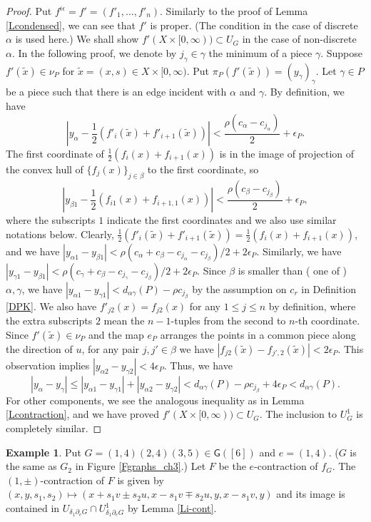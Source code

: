 \documentclass[reqno]{amsart}
\theoremstyle{definition}
\newtheorem{exa}[defi]{Example}
\theoremstyle{plain}
\newcommand{\eps}{\epsilon}
\newcommand{\GG}{\mathsf{G}}%
\begin{document}
\begin{proof}
Put  $f^{i\eps}=f'=(f'_1,\dots, f'_n)$. Similarly to the proof of Lemma \ref{Lcondensed}, we can see that $f'$ is proper. (The condition in the case of discrete $\alpha$ is used here.)  We shall show $f'(X\times [0,\infty))\subset U_{G}$ in the case of non-discrete $\alpha$. In the following proof, we denote by $j_\gamma\in \gamma$ the minimum of a piece $\gamma$.  Suppose $f'(\tilde x)\in\nu_{P}$ for $\tilde x=(x,s)\in X\times [0,\infty)$. Put $\pi_P(f'(\tilde x))=(y_\gamma)_\gamma$. Let   $\gamma\in P$ be a piece such that there is an edge incident with $\alpha$ and $\gamma$.  By definition, we have
\[
|y_\alpha-\frac{1}{2}(f'_i(\tilde x)+f'_{i+1}(\tilde x))|<\frac{\rho (c_\alpha-c_{j_\alpha})}{2}+\eps_P.
\]
 The first coordinate of $\frac{1}{2} (f_i(x)+f_{i+1}(x))$ is in the image of projection of the convex hull of $\{f_j(x)\}_{j\in \beta}$ to the first coordinate,  so 
\[
|y_{\beta 1}-\frac{1}{2}(f_{i1}(x)+f_{i+1,1}(x))|<\frac{\rho (c_\beta-c_{j_\beta})}{2}+\eps_P,
\]
where the subscripts $1$ indicate the first coordinates and we also use similar notations below. Clearly, $\frac{1}{2} (f'_i(\tilde x)+f'_{i+1}(\tilde x))=\frac{1}{2} (f_i(x)+f_{i+1}(x))$, and
 we have $|y_{\alpha 1}-y_{\beta 1}|<\rho (c_\alpha+c_\beta-c_{j_\alpha}-c_{j_\beta})/2+2\eps_P$. Similarly, we have $|y_{\gamma 1}-y_{\beta 1}|<\rho (c_\gamma+c_\beta-c_{j_\gamma}-c_{j_\beta})/2+2\eps_P$. Since $\beta$ is smaller than ( one of ) $\alpha, \gamma$,
we have
$|y_{\alpha 1}-y_{\gamma 1}|<d_{\alpha\gamma}(P)-\rho c_{j_\beta}$ by the assumption on $c_r$ in Definition \ref{DPK}.  We also have $f'_{j2}(x)=f_{j 2}(x)$ for any $1\leq j\leq n$ by definition, where the extra subscripts $2$ mean the $n-1$-tuples from  the second to $n$-th coordinate. Since $f'(\tilde x)\in \nu_{P}$ and the map $e_P$ arranges the points in a common piece along the direction of $u$, for any pair $j,j'\in \beta$ we have $|f_{j2}(\tilde x)-f_{j',2}(\tilde x)|<2\eps_{P}$. This observation implies  $|y_{\alpha 2}-y_{\gamma 2}|<4\eps_{P}$. Thus, we have 
\[
|y_\alpha-y_\gamma|\leq |y_{\alpha1}-y_{\gamma1}|+|y_{\alpha2}-y_{\gamma2}|<d_{\alpha\gamma}(P)-\rho c_{j_\beta}+4\eps_{P}<d_{\alpha\gamma}(P).
\]
For other components, we see the analogous inequality as in Lemma \ref{Lcontraction}, and we have proved $f'(X\times [0,\infty))\subset U_{G}$. The inclusion to $U^1_G$ is completely similar. 
\end{proof}
\begin{exa}\label{Ei-cont}
Put $G=(1,4)(2,4)(3,5)\in \GG([6])$ and $e=(1,4)$. ($G$ is the same as $G_2$ in Figure \ref{Fgraphs_ch3}.) Let $F$ be the $e$-contraction of $f_G$. The $(1,\pm)$-contraction of $F$ is given by $(x,y,s_1,s_2)\mapsto (x+s_1v\pm s_2u, x-s_1v\mp s_2u, y, x-s_1v, y)$ and its image is contained in $U_{\delta_1\partial_eG}\cap U^1_{\delta_1\partial_eG}$ by Lemma \ref{Li-cont}.
\end{exa}
\end{document}
